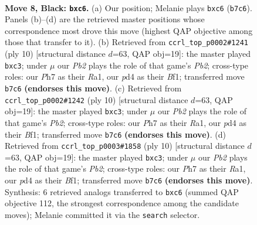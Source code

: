 \documentclass[11pt]{article}
\begin{document}
\begin{figure}[p]\centering
\begin{subfigure}{0.46\textwidth}\centering
\resizebox{\linewidth}{!}{%
\newchessgame
\chessboard[
  setfen={r1bqkbr1/pp1n1ppp/2B1p3/2ppP3/3P4/2P5/PP1N1PPP/R1BQK1NR b KQq - 0 8},
  showmover=false,
  pgfstyle=straightmove, color=movearrow, markmove={b7-c6}
]}
\caption{}
\end{subfigure}\hfill
\begin{subfigure}{0.46\textwidth}\centering
\resizebox{\linewidth}{!}{%
\newchessgame
\chessboard[
  setfen={rnbqk1nr/pp3ppp/4p3/2pp4/2PP4/P1b1P3/1P3PPP/R1BQKBNR w KQkq - 0 6},
  showmover=false,
  pgfstyle=straightmove, color=movearrow, markmove={b2-c3}
]}
\caption{}
\end{subfigure}
\\[4pt]
\begin{subfigure}{0.46\textwidth}\centering
\resizebox{\linewidth}{!}{%
\newchessgame
\chessboard[
  setfen={rnbqk1nr/pp3ppp/4p3/2pp4/2PP4/P1b1P3/1P3PPP/R1BQKBNR w KQkq - 0 6},
  showmover=false,
  pgfstyle=straightmove, color=movearrow, markmove={b2-c3}
]}
\caption{}
\end{subfigure}\hfill
\begin{subfigure}{0.46\textwidth}\centering
\resizebox{\linewidth}{!}{%
\newchessgame
\chessboard[
  setfen={rnbqk1nr/pp3ppp/4p3/2pp4/2PP4/P1b1P3/1P3PPP/R1BQKBNR w KQkq - 0 6},
  showmover=false,
  pgfstyle=straightmove, color=movearrow, markmove={b2-c3}
]}
\caption{}
\end{subfigure}
\caption{\textbf{Move 8, Black: \texttt{bxc6}.} (a) Our position; Melanie plays \texttt{bxc6} (\texttt{b7c6}). Panels (b)--(d) are the retrieved master positions whose correspondence most drove this move (highest QAP objective among those that transfer to it). (b) Retrieved from \texttt{ccrl\_top\_p0002\#1241} (ply 10) [structural distance $d$=63, QAP obj=19]: the master played \texttt{bxc3}; under $\mu$ our \emph{Pb2} plays the role of that game's \emph{Pb2}; cross-type roles: our \emph{P}h7 as their \emph{R}a1, our \emph{p}d4 as their \emph{B}f1; transferred move \texttt{b7c6} \textbf{(endorses this move)}. (c) Retrieved from \texttt{ccrl\_top\_p0002\#1242} (ply 10) [structural distance $d$=63, QAP obj=19]: the master played \texttt{bxc3}; under $\mu$ our \emph{Pb2} plays the role of that game's \emph{Pb2}; cross-type roles: our \emph{P}h7 as their \emph{R}a1, our \emph{p}d4 as their \emph{B}f1; transferred move \texttt{b7c6} \textbf{(endorses this move)}. (d) Retrieved from \texttt{ccrl\_top\_p0003\#1858} (ply 10) [structural distance $d$=63, QAP obj=19]: the master played \texttt{bxc3}; under $\mu$ our \emph{Pb2} plays the role of that game's \emph{Pb2}; cross-type roles: our \emph{P}h7 as their \emph{R}a1, our \emph{p}d4 as their \emph{B}f1; transferred move \texttt{b7c6} \textbf{(endorses this move)}. Synthesis: 6 retrieved analogs transferred to \texttt{bxc6} (summed QAP objective 112, the strongest correspondence among the candidate moves); Melanie committed it via the \texttt{search} selector.}
\label{fig:thought-m15}
\end{figure}
\end{document}
